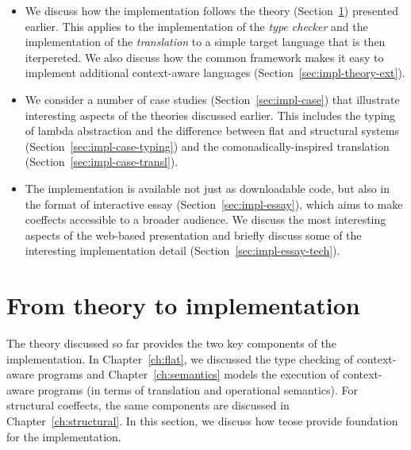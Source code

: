 \begin{itemize}
\item We discuss how the implementation follows the theory (Section~\ref{sec:impl-theory}) presented earlier.
  This applies to the implementation of the \emph{type checker} and the implementation of the \emph{translation}
  to a simple target language that is then iterpereted. We also discuss how the common framework makes it
  easy to implement additional context-aware languages (Section~\ref{sec:impl-theory-ext}).

\item We consider a number of case studies (Section~\ref{sec:impl-case}) that illustrate interesting
  aspects of the theories discussed earlier. This includes the typing of lambda abstraction and the
  difference between flat and structural systems (Section~\ref{sec:impl-case-typing}) and the
  comonadically-inspired translation (Section~\ref{sec:impl-case-transl}).

\item The implementation is available not just as downloadable code, but also in the format of
  interactive essay (Section~\ref{sec:impl-essay}), which aims to make coeffects
  accessible to a broader audience. We discuss the most interesting aspects of the web-based
  presentation and briefly discuss some of the interesting implementation detail
  (Section~\ref{sec:impl-essay-tech}).
\end{itemize}

%
%

\section{From theory to implementation}
\label{sec:impl-theory}

The theory discussed so far provides the two key components of the implementation. In
Chapter~\ref{ch:flat}, we discussed the type checking of context-aware programs and
Chapter~\ref{ch:semantics} models the execution of context-aware programs (in terms of
translation and operational semantics). For structural coeffects, the same components are discussed
in Chapter~\ref{ch:structural}. In this section, we discuss how teose provide foundation for the
implementation.

